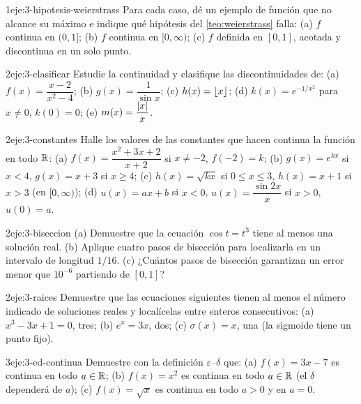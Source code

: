 \begin{ejercicio}{1}{eje:3-hipotesis-weierstrass}
Para cada caso, dé un ejemplo de función que no alcance su máximo e indique qué hipótesis del \cref{teo:weierstrass} falla: (a) $f$ continua en $(0,1]$; (b) $f$ continua en $[0,\infty)$; (c) $f$ definida en $[0,1]$, acotada y discontinua en un solo punto.
\end{ejercicio}

\begin{ejercicio}{2}{eje:3-clasificar}
Estudie la continuidad y clasifique las discontinuidades de: (a) $f(x)=\dfrac{x-2}{x^{2}-4}$; (b) $g(x)=\dfrac{1}{\sin x}$; (c) $h(x)=\lfloor x\rfloor$; (d) $k(x)=e^{-1/x^{2}}$ para $x\ne0$, $k(0)=0$; (e) $m(x)=\dfrac{\lvert x\rvert}{x}$.
\end{ejercicio}

\begin{ejercicio}{2}{eje:3-constantes}
Halle los valores de las constantes que hacen continua la función en todo $\mathbb{R}$: (a) $f(x)=\dfrac{x^{2}+3x+2}{x+2}$ si $x\ne-2$, $f(-2)=k$; (b) $g(x)=e^{kx}$ si $x<4$, $g(x)=x+3$ si $x\ge4$; (c) $h(x)=\sqrt{kx}$ si $0\le x\le3$, $h(x)=x+1$ si $x>3$ (en $[0,\infty)$); (d) $u(x)=ax+b$ si $x<0$, $u(x)=\dfrac{\sin 2x}{x}$ si $x>0$, $u(0)=a$.
\end{ejercicio}

\begin{ejercicio}{2}{eje:3-biseccion}
(a) Demuestre que la ecuación $\cos t=t^{3}$ tiene al menos una solución real. (b) Aplique cuatro pasos de bisección para localizarla en un intervalo de longitud $1/16$. (c) ¿Cuántos pasos de bisección garantizan un error menor que $10^{-6}$ partiendo de $[0,1]$?
\end{ejercicio}

\begin{ejercicio}{2}{eje:3-raices}
Demuestre que las ecuaciones siguientes tienen al menos el número indicado de soluciones reales y localícelas entre enteros consecutivos: (a) $x^{3}-3x+1=0$, tres; (b) $e^{x}=3x$, dos; (c) $\sigma(x)=x$, una (la sigmoide tiene un punto fijo).
\end{ejercicio}

\begin{ejercicio}{3}{eje:3-ed-continua}
Demuestre con la definición $\varepsilon$--$\delta$ que: (a) $f(x)=3x-7$ es continua en todo $a\in\mathbb{R}$; (b) $f(x)=x^{2}$ es continua en todo $a\in\mathbb{R}$ (el $\delta$ dependerá de $a$); (c) $f(x)=\sqrt{x}$ es continua en todo $a>0$ y en $a=0$.
\end{ejercicio}

